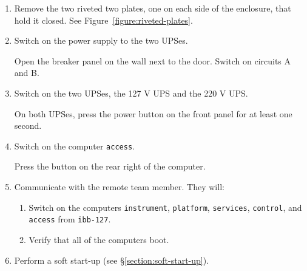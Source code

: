 \begin{enumerate}
\item
Remove the two riveted two plates, one on each side of the enclosure, that hold it closed. See Figure~\ref{figure:riveted-plates}.

\item Switch on the power supply to the two UPSes.

Open the breaker panel on the wall next to the door. Switch on circuits A and B.

\item Switch on the two UPSes, the 127 V UPS and the 220 V UPS.

On both UPSes, press the power button on the front panel for at least one second.

\item Switch on the computer \verb|access|.

Press the button on the rear right of the computer.

\item Communicate with the remote team member. They will:

\begin{enumerate}
    \item Switch on the computers \verb|instrument|, \verb|platform|, \verb|services|, \verb|control|, and \verb|access| from \verb|ibb-127|.
    \item Verify that all of the computers boot.
\end{enumerate}

\item Perform a soft start-up (see \S\ref{section:soft-start-up}).

\end{enumerate}